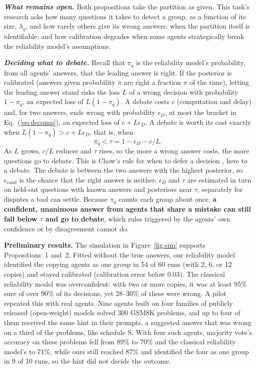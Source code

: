 \documentclass[12pt,letterpaper]{article}
\newcommand{\hd}[1]{\ifhmode\par\fi\addvspace{1pt}\noindent\textbf{#1}\hspace{0.35em}}
\newcommand{\slab}[1]{\textbf{\textit{#1}}}
\begin{document}
\slab{What remains open.} Both propositions take the partition as given. This task's research asks how many questions it takes to detect a group, as a function of its size, $\lambda_g$, and how rarely others give its wrong answers; when the partition itself is identifiable; and how calibration degrades when some agents strategically break the reliability model's assumptions.

\slab{Deciding what to debate.} Recall that $\pi_q$ is the reliability model's probability, from all agents' answers, that the leading answer is right. If the posterior is calibrated (answers given probability $\pi$ are right a fraction $\pi$ of the time), letting the leading answer stand risks the loss $L$ of a wrong decision with probability $1-\pi_q$, an expected loss of $L(1-\pi_q)$. A debate costs $c$ (computation and delay) and, for two answers, ends wrong with probability $\epsilon_D$, at most the bracket in Eq.~(\ref{eq:decomp}), an expected loss of $c+L\epsilon_D$. A debate is worth its cost exactly when $L(1-\pi_q)>c+L\epsilon_D$, that is, when
\begin{equation}
\pi_q<\tau=1-\epsilon_D-c/L.
\label{eq:threshold}
\end{equation}
As $L$ grows, $c/L$ reduces and $\tau$ rises, so the more a wrong answer costs, the more questions go to debate. This is Chow's rule for when to defer a decision \citep{chow1970optimum}, here to a debate. The debate is between the two answers with the highest posterior, so $\epsilon_{\text{cand}}$ is the chance that the right answer is neither; $\epsilon_D$ and $\tau$ are estimated in turn on held-out questions with known answers and posteriors near $\tau$, separately for disputes a tool can settle. Because $\pi_q$ counts each group about once, \textbf{a confident, unanimous answer from agents that share a mistake can still fall below $\tau$ and go to debate}, which rules triggered by the agents' own confidence or by disagreement cannot do.

\hd{Preliminary results.} The simulation in Figure~\ref{fig:sim} supports Propositions~1 and~2. Fitted without the true answers, our reliability model identified the copying agents as one group in 54 of 60 runs (with 2, 6, or 12 copies) and stayed calibrated (calibration error below 0.03). The classical reliability model was overconfident: with two or more copies, it was at least 95\% sure of over 90\% of its decisions, yet 28--30\% of these were wrong. A pilot repeated this with real agents. Nine agents built on four families of publicly released (open-weight) models solved 300 GSM8K problems, and up to four of them received the same hint in their prompts, a suggested answer that was wrong on a third of the problems, like schedule S. With four such agents, majority vote's accuracy on these problems fell from 89\% to 70\% and the classical reliability model's to 71\%, while ours still reached 87\% and identified the four as one group in 9 of 10 runs, so the hint did not decide the outcome.
\end{document}
